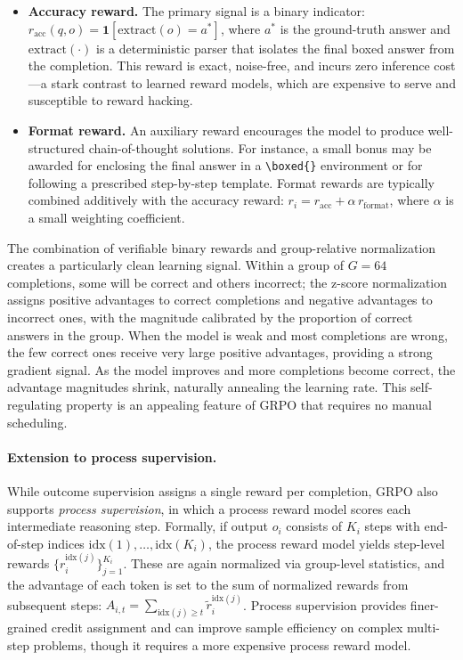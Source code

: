 \begin{itemize}[leftmargin=1.8em,itemsep=2pt]
\item \textbf{Accuracy reward.}  The primary signal is a binary indicator:
      $r_{\text{acc}}(q, o) = \mathbf{1}[\text{extract}(o) = a^*]$, where
      $a^*$ is the ground-truth answer and $\text{extract}(\cdot)$ is a
      deterministic parser that isolates the final boxed answer from the
      completion.  This reward is exact, noise-free, and incurs zero
      inference cost---a stark contrast to learned reward models, which
      are expensive to serve and susceptible to reward hacking.
\item \textbf{Format reward.}  An auxiliary reward encourages the model
      to produce well-structured chain-of-thought solutions.  For
      instance, a small bonus may be awarded for enclosing the final
      answer in a \verb|\boxed{}| environment or for following a
      prescribed step-by-step template.  Format rewards are typically
      combined additively with the accuracy reward:
      $r_i = r_{\text{acc}} + \alpha\, r_{\text{format}}$, where $\alpha$
      is a small weighting coefficient.
\end{itemize}

\noindent
The combination of verifiable binary rewards and group-relative
normalization creates a particularly clean learning signal.  Within a
group of $G = 64$ completions, some will be correct and others incorrect;
the z-score normalization assigns positive advantages to correct
completions and negative advantages to incorrect ones, with the magnitude
calibrated by the proportion of correct answers in the group.  When the
model is weak and most completions are wrong, the few correct ones
receive very large positive advantages, providing a strong gradient
signal.  As the model improves and more completions become correct, the
advantage magnitudes shrink, naturally annealing the learning rate.
This self-regulating property is an appealing feature of GRPO that
requires no manual scheduling.

\paragraph{Extension to process supervision.}
While outcome supervision assigns a single reward per completion, GRPO
also supports \emph{process supervision}, in which a process reward model
scores each intermediate reasoning step.  Formally, if output $o_i$
consists of $K_i$ steps with end-of-step indices
$\text{idx}(1), \ldots, \text{idx}(K_i)$, the process reward model yields
step-level rewards $\{r^{\text{idx}(j)}_i\}_{j=1}^{K_i}$.  These are
again normalized via group-level statistics, and the advantage of each
token is set to the sum of normalized rewards from subsequent steps:
$\hat{A}_{i,t} = \sum_{\text{idx}(j) \geq t} \tilde{r}^{\text{idx}(j)}_i$.
Process supervision provides finer-grained credit assignment and can
improve sample efficiency on complex multi-step problems, though it
requires a more expensive process reward model.

